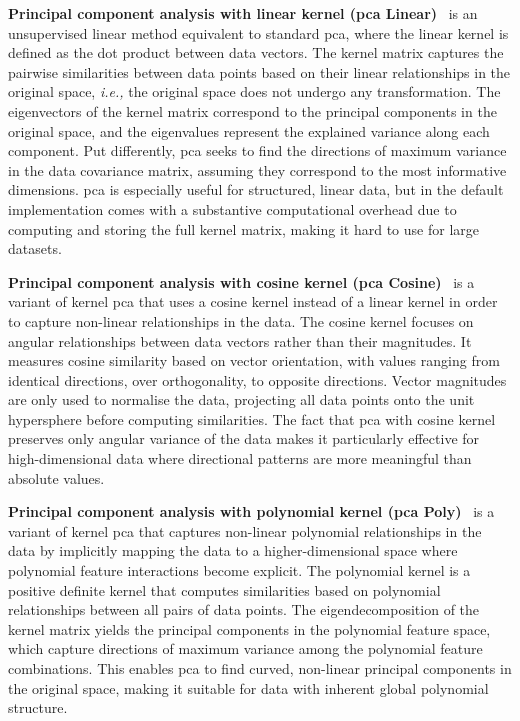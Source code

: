     \noindent \textbf{Principal component analysis with linear kernel (\gls{pca} Linear)}~\citep{Pearson1901} is an unsupervised linear method equivalent to standard \gls{pca}, where the linear kernel is defined as the dot product between data vectors. The kernel matrix captures the pairwise similarities between data points based on their linear relationships in the original space, \emph{i.e.,} the original space does not undergo any transformation. The eigenvectors of the kernel matrix correspond to the principal components in the original space, and the eigenvalues represent the explained variance along each component. Put differently, \gls{pca} seeks to find the directions of maximum variance in the data covariance matrix, assuming they correspond to the most informative dimensions. \gls{pca} is especially useful for structured, linear data, but in the default implementation comes with a substantive computational overhead due to computing and storing the full kernel matrix, making it hard to use for large datasets.

    \noindent \textbf{Principal component analysis with cosine kernel (\gls{pca} Cosine)}~\citep{SchEtAl97} is a variant of kernel \gls{pca} that uses a cosine kernel instead of a linear kernel in order to capture non-linear relationships in the data. The cosine kernel focuses on angular relationships between data vectors rather than their magnitudes. It measures cosine similarity based on vector orientation, with values ranging from identical directions, over orthogonality, to opposite directions. Vector magnitudes are only used to normalise the data, projecting all data points onto the unit hypersphere before computing similarities. The fact that \gls{pca} with cosine kernel preserves only angular variance of the data makes it particularly effective for high-dimensional data where directional patterns are more meaningful than absolute values.

    \noindent \textbf{Principal component analysis with polynomial kernel (\gls{pca} Poly)}~\citep{SchEtAl97} is a variant of kernel \gls{pca} that captures non-linear polynomial relationships in the data by implicitly mapping the data to a higher-dimensional space where polynomial feature interactions become explicit. The polynomial kernel is a positive definite kernel that computes similarities based on polynomial relationships between all pairs of data points. The eigendecomposition of the kernel matrix yields the principal components in the polynomial feature space, which capture directions of maximum variance among the polynomial feature combinations. This enables \gls{pca} to find curved, non-linear principal components in the original space, making it suitable for data with inherent global polynomial structure.

